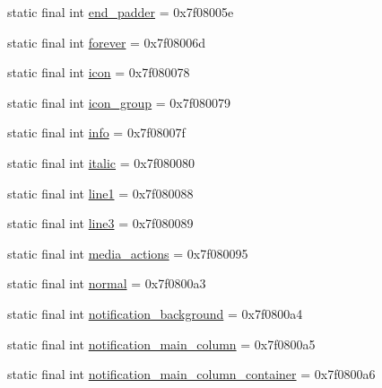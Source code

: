 \begin{DoxyCompactItemize}
\item 
static final int \mbox{\hyperlink{classandroid_1_1support_1_1mediacompat_1_1R_1_1id_a724d5276dfd452a405d38a65c86bb16e}{end\+\_\+padder}} = 0x7f08005e
\item 
static final int \mbox{\hyperlink{classandroid_1_1support_1_1mediacompat_1_1R_1_1id_a13d4eb6350344f9be802fd9c7a777070}{forever}} = 0x7f08006d
\item 
static final int \mbox{\hyperlink{classandroid_1_1support_1_1mediacompat_1_1R_1_1id_a97f8ae23193f523cb3c7d80bd858c061}{icon}} = 0x7f080078
\item 
static final int \mbox{\hyperlink{classandroid_1_1support_1_1mediacompat_1_1R_1_1id_afee11ff879519821d86ec29037255074}{icon\+\_\+group}} = 0x7f080079
\item 
static final int \mbox{\hyperlink{classandroid_1_1support_1_1mediacompat_1_1R_1_1id_a1471ccc5ed7987163993f6802ad75c66}{info}} = 0x7f08007f
\item 
static final int \mbox{\hyperlink{classandroid_1_1support_1_1mediacompat_1_1R_1_1id_aeb3a83f4faf38671c6cc397b3e02c0fe}{italic}} = 0x7f080080
\item 
static final int \mbox{\hyperlink{classandroid_1_1support_1_1mediacompat_1_1R_1_1id_a39818ea212eae5f5d5a732df62c05b5a}{line1}} = 0x7f080088
\item 
static final int \mbox{\hyperlink{classandroid_1_1support_1_1mediacompat_1_1R_1_1id_a80a0afcb08dc0adf32e6243fcfd1bf15}{line3}} = 0x7f080089
\item 
static final int \mbox{\hyperlink{classandroid_1_1support_1_1mediacompat_1_1R_1_1id_a71d790b5fc85a08667292c78fe432184}{media\+\_\+actions}} = 0x7f080095
\item 
static final int \mbox{\hyperlink{classandroid_1_1support_1_1mediacompat_1_1R_1_1id_ab57d61231fc23a4009c6318e35a1c9a3}{normal}} = 0x7f0800a3
\item 
static final int \mbox{\hyperlink{classandroid_1_1support_1_1mediacompat_1_1R_1_1id_a5c62145dcbaaac1a56ae8f5dd0c5ff27}{notification\+\_\+background}} = 0x7f0800a4
\item 
static final int \mbox{\hyperlink{classandroid_1_1support_1_1mediacompat_1_1R_1_1id_a608aa023d413c7786a04081f541959a2}{notification\+\_\+main\+\_\+column}} = 0x7f0800a5
\item 
static final int \mbox{\hyperlink{classandroid_1_1support_1_1mediacompat_1_1R_1_1id_aebb8765ed159bdfff53e490eab345578}{notification\+\_\+main\+\_\+column\+\_\+container}} = 0x7f0800a6
\item 

\end{DoxyCompactItemize}
